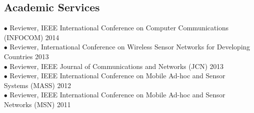 \documentclass[margin, centered]{resume}
\begin{document}
\begin{resume}
    \section{\mysidestyle Academic Services}
    $\bullet$ Reviewer, IEEE International Conference on Computer Communications (INFOCOM) \hfill 2014\\
    $\bullet$ Reviewer, International Conference on Wireless Sensor Networks for Developing Countries \hfill 2013\\
    $\bullet$ Reviewer, IEEE Journal of Communications and Networks (JCN) \hfill 2013\\
    $\bullet$ Reviewer, IEEE International Conference on Mobile Ad-hoc and Sensor Systems (MASS) \hfill 2012\\
    $\bullet$ Reviewer, IEEE International Conference on Mobile Ad-hoc and Sensor Networks (MSN) \hfill 2011\\ \vspace{-5mm}
	
	
	

\end{resume}
\end{document}
